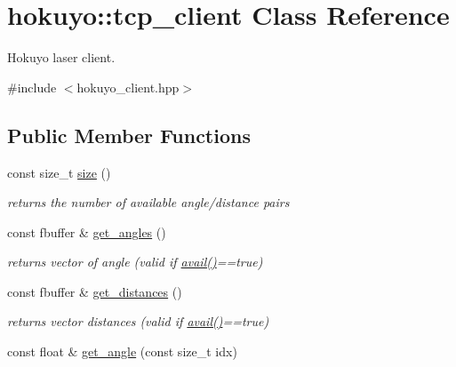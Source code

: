 \hypertarget{classhokuyo_1_1tcp__client}{\section{hokuyo\-:\-:tcp\-\_\-client Class Reference}
\label{classhokuyo_1_1tcp__client}
}


Hokuyo laser client.  




{\ttfamily \#include $<$hokuyo\-\_\-client.\-hpp$>$}

\subsection*{Public Member Functions}
\begin{DoxyCompactItemize}
\item 
\hypertarget{classhokuyo_1_1tcp__client_a8ffbb91db68f99829b3cd64e9875ce25}{const size\-\_\-t \hyperlink{classhokuyo_1_1tcp__client_a8ffbb91db68f99829b3cd64e9875ce25}{size} ()}\label{classhokuyo_1_1tcp__client_a8ffbb91db68f99829b3cd64e9875ce25}

\begin{DoxyCompactList}\small\item\em returns the number of available angle/distance pairs \end{DoxyCompactList}\item 
\hypertarget{classhokuyo_1_1tcp__client_a3b0554fedfa5db82eb7dd98321e84c54}{const fbuffer \& \hyperlink{classhokuyo_1_1tcp__client_a3b0554fedfa5db82eb7dd98321e84c54}{get\-\_\-angles} ()}\label{classhokuyo_1_1tcp__client_a3b0554fedfa5db82eb7dd98321e84c54}

\begin{DoxyCompactList}\small\item\em returns vector of angle (valid if \hyperlink{classhokuyo_1_1tcp__client_a130f57b5d6d61da417b3cbaac82c2afc}{avail()}==true) \end{DoxyCompactList}\item 
\hypertarget{classhokuyo_1_1tcp__client_accf06626b62b055ed25d2917059df73e}{const fbuffer \& \hyperlink{classhokuyo_1_1tcp__client_accf06626b62b055ed25d2917059df73e}{get\-\_\-distances} ()}\label{classhokuyo_1_1tcp__client_accf06626b62b055ed25d2917059df73e}

\begin{DoxyCompactList}\small\item\em returns vector distances (valid if \hyperlink{classhokuyo_1_1tcp__client_a130f57b5d6d61da417b3cbaac82c2afc}{avail()}==true) \end{DoxyCompactList}\item 
\hypertarget{classhokuyo_1_1tcp__client_ab35989483cd8411fe7a634ab8a15057f}{const float \& \hyperlink{classhokuyo_1_1tcp__client_ab35989483cd8411fe7a634ab8a15057f}{get\-\_\-angle} (const size\-\_\-t idx)}\label{classhokuyo_1_1tcp__client_ab35989483cd8411fe7a634ab8a15057f}


\end{DoxyCompactItemize}
